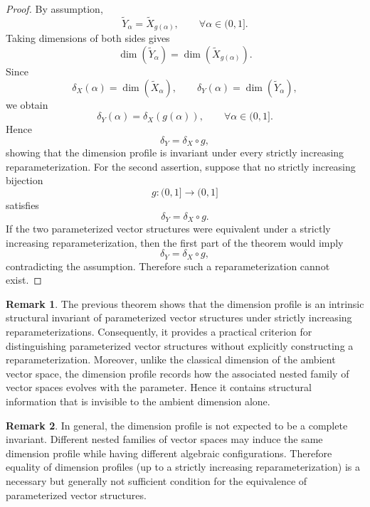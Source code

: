 \documentclass[preprint,12pt]{elsarticle}
\theoremstyle{definition}
\newtheorem{remark}{Remark}[section]
\begin{document}
\begin{proof}
	
	By assumption,
	\[
	\widetilde Y_\alpha
	=
	\widetilde X_{g(\alpha)},
	\qquad
	\forall\alpha\in(0,1].
	\]
	Taking dimensions of both sides gives
	\[
	\dim(\widetilde Y_\alpha)
	=
	\dim(\widetilde X_{g(\alpha)}).
	\]
	Since
	\[
	\delta_X(\alpha)
	=
	\dim(\widetilde X_\alpha),
	\qquad
	\delta_Y(\alpha)
	=
	\dim(\widetilde Y_\alpha),
	\]
	we obtain
	\[
	\delta_Y(\alpha)
	=
	\delta_X(g(\alpha)),
	\qquad
	\forall\alpha\in(0,1].
	\]
	Hence
	\[
	\delta_Y=\delta_X\circ g,
	\]
	showing that the dimension profile is invariant under every strictly
	increasing reparameterization.
	For the second assertion, suppose that no strictly increasing bijection
	\[
	g:(0,1]\to(0,1]
	\]
	satisfies\[
	\delta_Y=\delta_X\circ g.
	\]
	If the two parameterized vector structures were equivalent under a strictly
	increasing reparameterization, then the first part of the theorem would imply
	\[
	\delta_Y=\delta_X\circ g,
	\]
	contradicting the assumption.
	Therefore such a reparameterization cannot exist.
	
\end{proof}

\begin{remark}
	The previous theorem shows that the dimension profile is an intrinsic
	structural invariant of parameterized vector structures under strictly
	increasing reparameterizations.
	Consequently, it provides a practical criterion for distinguishing
	parameterized vector structures without explicitly constructing a
	reparameterization.
	Moreover, unlike the classical dimension of the ambient vector space,
	the dimension profile records how the associated nested family of vector
	spaces evolves with the parameter.
	Hence it contains structural information that is invisible to the ambient
	dimension alone.
	
\end{remark}

\begin{remark}
	In general, the dimension profile is not expected to be a complete
	invariant.
	Different nested families of vector spaces may induce the same dimension
	profile while having different algebraic configurations.
	Therefore equality of dimension profiles (up to a strictly increasing
	reparameterization) is a necessary but generally not sufficient condition
	for the equivalence of parameterized vector structures.
	
\end{remark}
\end{document}
